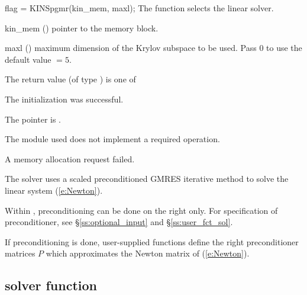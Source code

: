 {
  flag = KINSpgmr(kin\_mem, maxl);
}
{
  The function  selects the {\kinspgmr} linear solver. 
}
{
  \begin{args}
  \item[kin\_mem] ()
    pointer to the {\kinsol} memory block.
  \item[maxl] ()
    maximum dimension of the Krylov subspace to be used. Pass $0$ to use the 
    default value $=5$.
  \end{args}
}
{
  The return value  (of type ) is one of
  \begin{args}
  \item[\Id{KINSPGMR\_SUCCESS}] 
    The {\kinspgmr} initialization was successful.
  \item[\Id{KINSPGMR\_MEM\_NULL}]
    The  pointer is .
  \item[\Id{KINSPGMR\_ILL\_INPUT}]
    The {\nvector} module used does not implement a required operation.
  \item[\Id{KINSPGMR\_MEM\_FAIL}]
    A memory allocation request failed.
  \end{args}
}
{
  The {\kinspgmr} solver uses a scaled preconditioned GMRES
  iterative method to solve the linear system (\ref{e:Newton}).

  Within {\kinsol}, preconditioning can be done on the right only.
  For specification of preconditioner,
  see \S\ref{ss:optional_input} and \S\ref{ss:user_fct_sol}.

  If preconditioning is done, user-supplied functions define the right 
  preconditioner matrices $P$ which approximates the Newton matrix
  of (\ref{e:Newton}).
}

\subsection{{\kinsol} solver function}\label{ss:kinsol}


